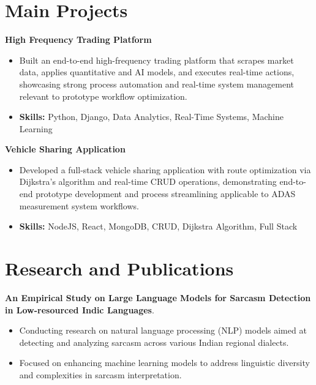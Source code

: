 \documentclass[a4paper,11pt]{article}
\begin{document}
\section{\textbf{Main Projects}}

\vspace{1mm}
  \textbf{High Frequency Trading Platform  }
\vspace{-1.5mm} %
\begin{itemize}
  \item Built an end-to-end high-frequency trading platform that scrapes market data, applies quantitative and AI models, and executes real-time actions, showcasing strong process automation and real-time system management relevant to prototype workflow optimization.
\vspace{-3mm}
  \item \textbf{Skills:} Python, Django, Data Analytics, Real-Time Systems, Machine Learning
\end{itemize}


\vspace{1mm}
   \textbf{Vehicle Sharing Application }
\vspace{-1.5mm} %
\begin{itemize}
  \item Developed a full-stack vehicle sharing application with route optimization via Dijkstra's algorithm and real-time CRUD operations, demonstrating end-to-end prototype development and process streamlining applicable to ADAS measurement system workflows.
\vspace{-3mm}
  \item \textbf{Skills:} NodeJS, React, MongoDB, CRUD, Dijkstra Algorithm, Full Stack
\end{itemize}



\section{\textbf{Research and Publications} \hfill }
\vspace{1mm}
  \textbf{An Empirical Study on Large Language Models for Sarcasm Detection in Low-resourced Indic Languages}.
\vspace{-1mm} %
\begin{itemize}
  \item Conducting research on natural language processing (NLP) models aimed at detecting and analyzing sarcasm across various Indian regional dialects.
\vspace{-3mm}
  \item Focused on enhancing machine learning models to address linguistic diversity and complexities in sarcasm interpretation.
\end{itemize}
\end{document}
